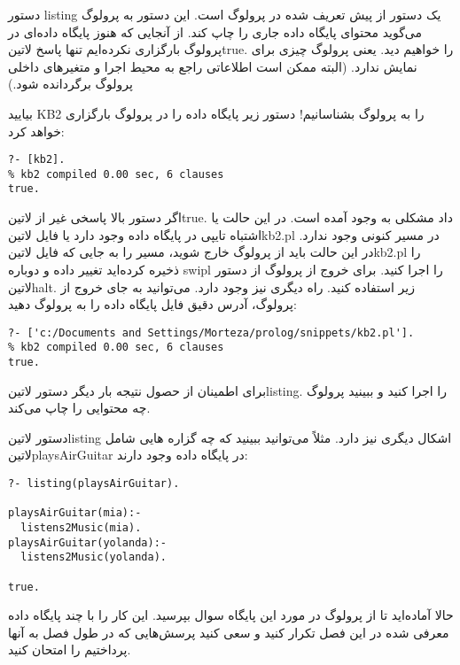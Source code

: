 دستور listing یک دستور از پیش تعریف شده در پرولوگ است. این دستور به پرولوگ می‌گوید محتوای پایگاه داده جاری را چاپ کند. از آنجایی که هنوز پایگاه داده‌ای در پرولوگ بارگزاری نکرده‌ایم تنها پاسخ ‌لاتین{true.} را خواهیم دید. یعنی پرولوگ چیزی برای نمایش ندارد. (البته ممکن است اطلاعاتی راجع به محیط اجرا و متغیرهای داخلی پرولوگ برگردانده شود.)

بیایید KB2 را به پرولوگ بشناسانیم! دستور زیر پایگاه داده را در پرولوگ بارگزاری خواهد کرد:

\begin{latin}
\begin{lstlisting}
?- [kb2].
% kb2 compiled 0.00 sec, 6 clauses
true.
\end{lstlisting}
\end{latin}

اگر دستور بالا پاسخی غیر از ‌لاتین{true.} داد مشکلی به وجود آمده است. در این حالت یا اشتباه تایپی در پایگاه داده وجود دارد یا فایل ‌لاتین{kb2.pl} در مسیر کنونی وجود ندارد. در این حالت باید از پرولوگ خارج شوید، مسیر را به جایی که فایل ‌لاتین{kb2.pl} را ذخیره کرده‌اید تغییر داده و دوباره swipl را اجرا کنید. برای خروج از پرولوگ از دستور ‌لاتین{halt.} زیر استفاده کنید. راه دیگری نیز وجود دارد. می‌توانید به جای خروج از پرولوگ، آدرس دقیق فایل پایگاه داده را به پرولوگ دهید:

\begin{latin}
\begin{lstlisting}
?- ['c:/Documents and Settings/Morteza/prolog/snippets/kb2.pl'].
% kb2 compiled 0.00 sec, 6 clauses
true.
\end{lstlisting}
\end{latin}

برای اطمینان از حصول نتیجه بار دیگر دستور ‌لاتین{listing.} را اجرا کنید و ببینید پرولوگ چه محتوایی را چاپ می‌کند.

دستور ‌لاتین{listing} اشکال دیگری نیز دارد. مثلاً می‌توانید ببینید که چه گزاره هایی شامل ‌لاتین{playsAirGuitar} در پایگاه داده وجود دارند:

\begin{latin}
\begin{lstlisting}
?- listing(playsAirGuitar).

playsAirGuitar(mia):-
  listens2Music(mia).
playsAirGuitar(yolanda):-
  listens2Music(yolanda).

true.
\end{lstlisting}
\end{latin}

حالا آماده‌اید تا از پرولوگ در مورد این پایگاه سوال بپرسید. این کار را با چند پایگاه داده معرفی شده در این فصل تکرار کنید و سعی کنید پرسش‌هایی که در طول فصل به آنها پرداختیم را امتحان کنید.